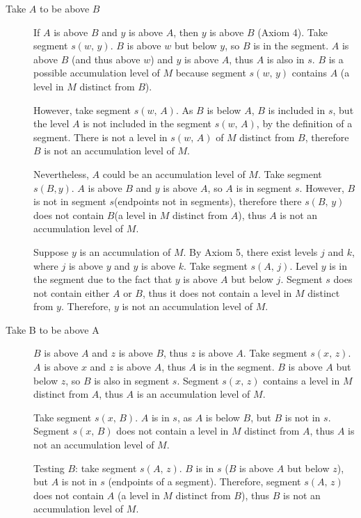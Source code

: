 \documentclass[12pt]{article}
\begin{document}
\begin{description}
    \item[Take $A$ to be above $B$] If $A$ is above $B$ and $y$ is above $A$, then $y$ is above $B$ (Axiom 4). Take segment $s(w,\, y)$. $B$ is above $w$ but below $y$, so $B$ is in the segment. $A$ is above $B$ (and thus above $w$) and $y$ is above $A$, thus $A$ is also in $s$. $B$ is a possible accumulation level of $M$ because segment $s(w,\, y)$ contains $A$ (a level in $M$ distinct from $B$).

    However, take segment $s(w,\, A)$. As $B$ is below $A$, $B$ is included in $s$, but the level $A$ is not included in the segment $s(w,\, A)$, by the definition of a segment. There is not a level in $s(w,\, A)$ of $M$ distinct from $B$, therefore $B$ is not an accumulation level of $M$.

    Nevertheless, $A$ could be an accumulation level of $M$. Take segment $s(B, y)$. $A$ is above $B$ and $y$ is above $A$, so $A$ is in segment $s$. However, $B$ is not in segment $s$(endpoints not in segments), therefore there $s(B,\, y)$ does not contain $B$(a level in $M$ distinct from $A$), thus $A$ is not an accumulation level of $M$.

    Suppose $y$ is an accumulation of $M$. By Axiom 5, there exist levels $j$ and $k$, where $j$ is above $y$ and $y$ is above $k$. Take segment $s(A,\, j)$. Level $y$ is in the segment due to the fact that $y$ is above $A$ but below $j$. Segment $s$ does not contain either $A$ or $B$, thus it does not contain a level in $M$ distinct from $y$. Therefore, $y$ is not an accumulation level of $M$.

    \item[Take B to be above A] $B$ is above $A$ and $z$ is above $B$, thus $z$ is above $A$. Take segment $s(x,\, z)$. $A$ is above $x$ and $z$ is above $A$, thus $A$ is in the segment. $B$ is above $A$ but below $z$, so $B$ is also in segment $s$. Segment $s(x,\, z)$ contains a level in $M$ distinct from $A$, thus $A$ is an accumulation level of $M$.

    Take segment $s(x,\, B)$. $A$ is in $s$, as $A$ is below $B$, but $B$ is not in $s$. Segment $s(x,\, B)$ does not contain a level in $M$ distinct from $A$, thus $A$ is not an accumulation level of $M$.

    Testing $B$: take segment $s(A,\, z)$. $B$ is in $s$ ($B$ is above $A$ but below $z$), but $A$ is not in $s$ (endpoints of a segment). Therefore, segment $s(A,\, z)$ does not contain $A$ (a level in $M$ distinct from $B$), thus $B$ is not an accumulation level of $M$.
\end{description}
\end{document}
